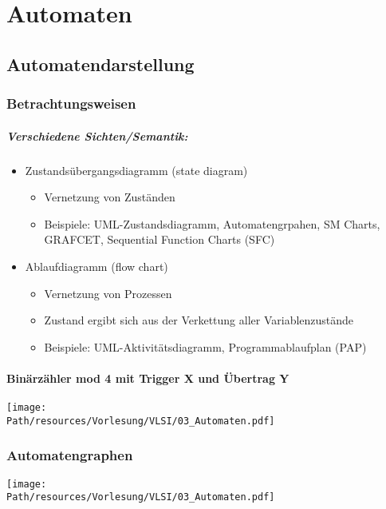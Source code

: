 \chapter{Automaten}

\section{Automatendarstellung}

\subsection{Betrachtungsweisen}
	\paragraph{Verschiedene Sichten/Semantik:}
	\begin{itemize}
		\item Zustandsübergangsdiagramm (state diagram)
			\begin{itemize}
				\item Vernetzung von Zuständen
				\item Beispiele: UML-Zustandsdiagramm, Automatengrpahen, SM Charts, GRAFCET, Sequential Function Charts (SFC)
			\end{itemize}
		\item Ablaufdiagramm (flow chart)
			\begin{itemize}
				\item Vernetzung von Prozessen
				\item Zustand ergibt sich aus der Verkettung aller Variablenzustände
				\item Beispiele: UML-Aktivitätsdiagramm, Programmablaufplan (PAP)
			\end{itemize}
	\end{itemize}
	
	\subsubsection{Binärzähler mod 4 mit Trigger X und Übertrag Y}	
		\begin{center}
			\texttt{[image: \\Path/resources/Vorlesung/VLSI/03\_Automaten.pdf]}
		\end{center}
	
\subsection{Automatengraphen}	
	\begin{center}
		\texttt{[image: \\Path/resources/Vorlesung/VLSI/03\_Automaten.pdf]}
	\end{center}
